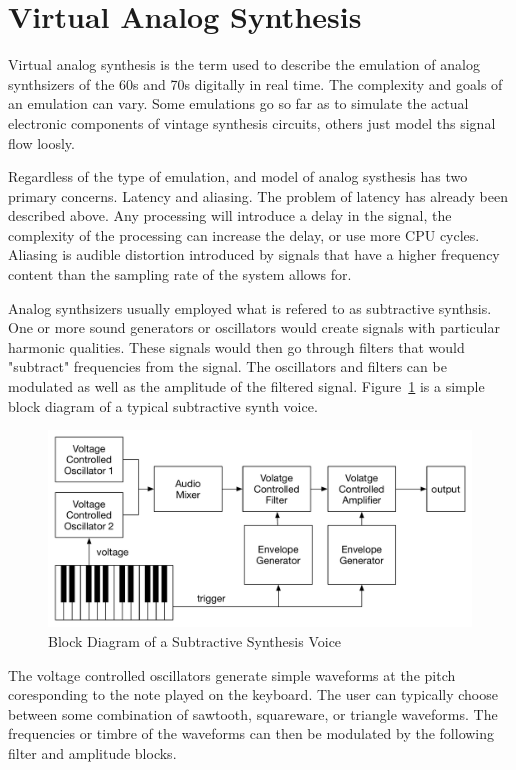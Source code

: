 \section{Virtual Analog Synthesis}

Virtual analog synthesis is the term used to describe the emulation of analog synthsizers of the 60s and 70s digitally in real time. The complexity and goals of an emulation can vary. Some emulations go so far as to simulate the actual electronic components of vintage synthesis circuits, others just model ths signal flow loosly.

Regardless of the type of emulation, and model of analog systhesis has two primary concerns. Latency and aliasing. The problem of latency has already been described above. Any processing will introduce a delay in the signal, the complexity of the processing can increase the delay, or use more CPU cycles. Aliasing is audible distortion introduced by signals that have a higher frequency content than the sampling rate of the system allows for.

Analog synthsizers usually employed what is refered to as subtractive synthsis. One or more sound generators or oscillators would create signals with particular harmonic qualities. These signals would then go through filters that would "subtract" frequencies from the signal. The oscillators and filters can be modulated as well as the amplitude of the filtered signal. Figure~\ref{fig:synth_voice_block} is a simple block diagram of a typical subtractive synth voice.

\begin{figure}[H]
    \centering
    \includegraphics[width=\textwidth]{assets/synth_voice_block.pdf}
    \caption{Block Diagram of a Subtractive Synthesis Voice}
    \label{fig:synth_voice_block}
\end{figure}

The voltage controlled oscillators generate simple waveforms at the pitch coresponding to the note played on the keyboard. The user can typically choose between some combination of sawtooth, squareware, or triangle waveforms. The frequencies or timbre of the waveforms can then be modulated by the following filter and amplitude blocks.

